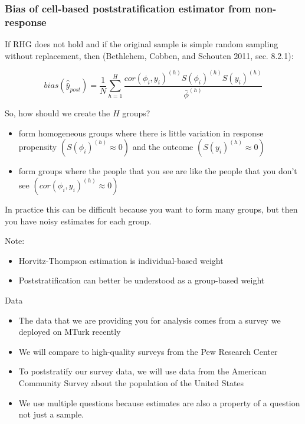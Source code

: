 \documentclass[aspectratio=169]{beamer}
\begin{document}
\begin{frame}
\frametitle{Bias of cell-based poststratification estimator from non-response}

If RHG does not hold and if the original sample is simple random sampling without replacement, then (Bethlehem, Cobben, and Schouten 2011, sec. 8.2.1):

$$bias(\hat{\bar{y}}_{post}) = \frac{1}{N} \sum_{h=1}^H \frac{cor(\phi_i, y_i)^{(h)} S(\phi_i)^{(h)} S(y_i)^{(h)}}{\bar{\phi}^{(h)}}$$

So, how should we create the $H$ groups? \pause
\begin{itemize}
\item form homogeneous groups where there is little variation in response propensity $(S(\phi_i)^{(h)} \approx 0)$ and the outcome $(S(y_i)^{(h)} \approx 0)$ \pause
\item form groups where the people that you see are like the people that you don't see $(cor(\phi_i, y_i)^{(h)} \approx 0)$
\end{itemize}

\vfill
In practice this can be difficult because you want to form many groups, but then you have noisy estimates for each group.

\end{frame}
\begin{frame}

Note:
\begin{itemize}
\item Horvitz-Thompson estimation is individual-based weight
\item Poststratification can better be understood as a group-based weight
\end{itemize}

\end{frame}
\begin{frame}{Data}

\begin{itemize}
\item The data that we are providing you for analysis comes from a survey we deployed on MTurk recently
\pause
\item We will compare to high-quality surveys from the Pew Research Center 
\pause
\item To poststratify our survey data, we will use data from the American Community Survey about the population of the United States
\pause
\item We use multiple questions because estimates are also a property of a question not just a sample.
\end{itemize}

\end{frame}
\end{document}
